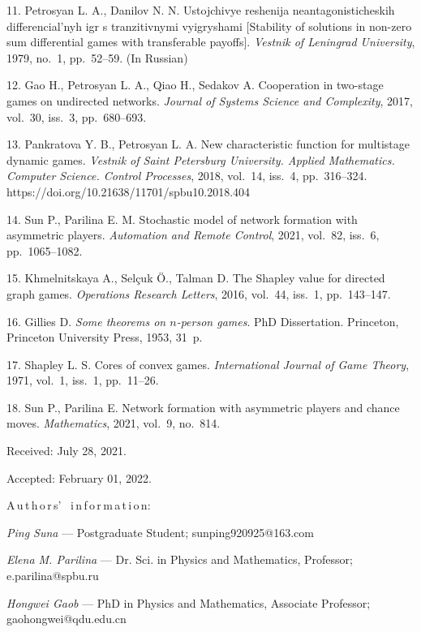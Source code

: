 {11. Petrosyan L. A., Danilov N. N. Ustojchivye reshenija
neantagonisticheskih dif\-fe\-ren\-ci\-al'nyh igr s tranzitivnymi vyigryshami [Stability of solutions in non-zero sum differential games with transferable payoffs]. \textit{Vestnik of Leningrad University}, 1979, no.~1, pp.~52--59.  (In Russian)

12. Gao H., Petrosyan L. A., Qiao H., Sedakov A. Cooperation in two-stage games on undirected networks. \textit{Journal of Systems Science and Complexity}, 2017, vol.~30, iss.~3, pp.~680--693.

13. Pankratova Y. B., Petrosyan L. A. New characteristic function for multistage dynamic games. \textit{Vestnik of Saint Petersburg University. Applied Mathematics. Computer Science. Control Processes}, 2018, vol.~14, iss.~4, pp.~316--324. https://doi.org/10.21638/11701/spbu10.2018.404

14. Sun P., Parilina E. M. Stochastic model of network formation with asymmetric players. \textit{Automation and Remote Control}, 2021, vol.~82, iss.~6, pp.~1065--1082.

15. Khmelnitskaya A., Sel\c{c}uk \"{O}., Talman D. The Shapley value for directed graph games. \textit{Operations Research Letters}, 2016, vol.~44, iss.~1, pp.~143--147.

16. Gillies D. \textit{Some theorems on $n$-person games}. PhD Dissertation. Princeton, Princeton Univer\-si\-ty Press, 1953, 31~p.

17. Shapley L. S. Cores of convex games. \textit{International Journal of Game Theory}, 1971, vol.~1, iss.~1, pp.~11--26.

18. Sun P., Parilina E. Network formation with asymmetric players and chance moves. \textit{Mathematics}, 2021, vol.~9, no.~814.



\vskip 1.5mm

%

\pagebreak
Received:  July 28, 2021.

Accepted: February 01, 2022.

\vskip 4.5mm%
A\,u\,t\,h\,o\,r\,s' \ i\,n\,f\,o\,r\,m\,a\,t\,i\,o\,n:

\vskip 2mm \textit{Ping Suna}  --- Postgraduate Student;
sunping920925@163.com \par%

\vskip 2mm \textit{Elena M. Parilina} --- Dr. Sci. in Physics and Mathematics, Professor; e.parilina@spbu.ru \par%

\vskip 2mm \textit{Hongwei Gaob} --- PhD in Physics and Mathematics, Associate Professor;  gaohongwei@qdu.edu.cn \par%
%
%
}
